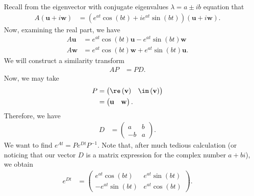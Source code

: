 \documentclass[10pt]{mypackage}
\begin{document}
\begin{example}
  Recall from the eigenvector with conjugate eigenvalues $\lambda = a \pm ib$ equation that
  \begin{align*}
    A \left( \mathbf{u} + i\mathbf{w} \right) &= \left( e^{at}\cos\left( bt \right) + ie^{at}\sin\left( bt \right)\right)\left( \mathbf{u} + i\mathbf{w} \right).
  \end{align*}
  Now, examining the real part, we have
  \begin{align*}
    A\mathbf{u} &= e^{at}\cos\left( bt \right)\mathbf{u} - e^{at}\sin\left( bt \right) \mathbf{w}\\
    A \mathbf{w} &= e^{at}\cos\left( bt \right)\mathbf{w} + e^{at}\sin\left( bt \right) \mathbf{u}.
  \end{align*}
  We will construct a similarity transform
  \begin{align*}
    AP &= PD.
  \end{align*}
  Now, we may take
  \begin{align*}
    P &= \begin{pmatrix}\re\left( \mathbf{v} \right) & \im\left( \mathbf{v} \right)\end{pmatrix}\\
      &= \begin{pmatrix}\mathbf{u} & \mathbf{w}\end{pmatrix}.
  \end{align*}
  Therefore, we have
  \begin{align*}
    D &= \begin{pmatrix}a & b \\ -b & a\end{pmatrix}.
  \end{align*}
  We want to find $e^{At} = Pe^{Dt}P^{-1}$. Note that, after much tedious calculation (or noticing that our vector $D$ is a matrix expression for the complex number $a + bi$), we obtain
  \begin{align*}
    e^{Dt} &= \begin{pmatrix}e^{at}\cos\left( bt \right) & e^{at}\sin\left( bt \right)\\-e^{at}\sin\left( bt \right) & e^{at}\cos\left( bt \right)\end{pmatrix}.
  \end{align*}
\end{example}
\end{document}
